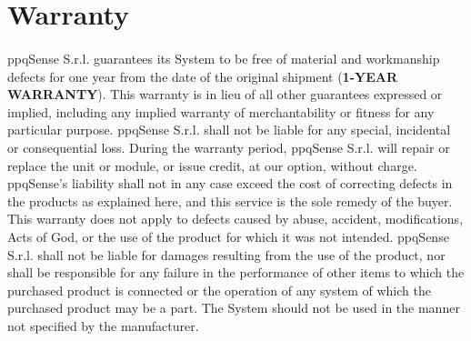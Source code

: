 \section{Warranty}
\paragraph{}ppqSense S.r.l. guarantees its \QubeModel  System to be free of material and workmanship defects for one year from the date of the original shipment (\textbf{1-YEAR WARRANTY}). This warranty is in lieu of all other guarantees expressed or implied, including any implied warranty of merchantability or fitness for any particular purpose. ppqSense S.r.l. shall not be liable for any special, incidental or consequential loss. During the warranty period, ppqSense S.r.l. will repair or replace the unit or module, or issue credit, at our option, without charge. ppqSense’s liability shall not in any case exceed the cost of correcting defects in the products as explained here, and this service is the sole remedy of the buyer. This warranty does not apply to defects caused by abuse, accident, modifications, Acts of God, or the use of the product for which it was not intended. ppqSense S.r.l. shall not be liable for damages resulting from the use of the product, nor shall be responsible for any failure in the performance of other items to which the purchased product is connected or the operation of any system of which the purchased product may be a part. The \QubeModel  System should not be used in the manner not specified by the manufacturer.

